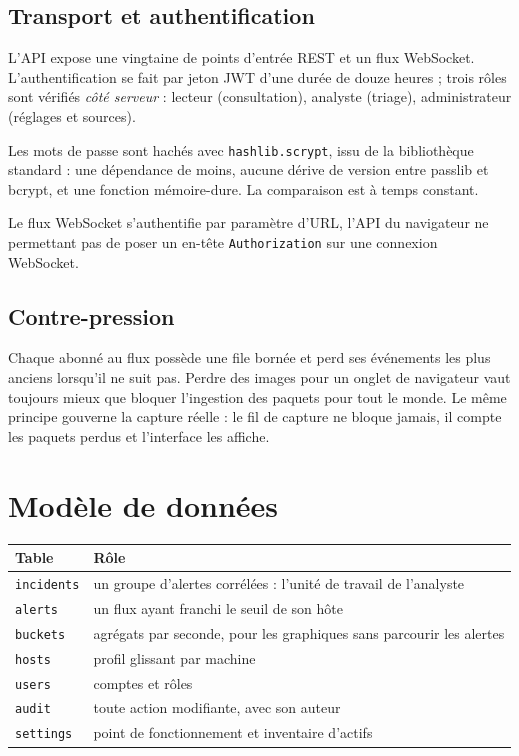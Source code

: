 \documentclass[11pt,a4paper]{article}
\begin{document}
\subsection{Transport et authentification}

L'API expose une vingtaine de points d'entrée REST et un flux WebSocket. L'authentification se fait
par jeton JWT d'une durée de douze heures ; trois rôles sont vérifiés \emph{côté serveur} :
lecteur (consultation), analyste (triage), administrateur (réglages et sources).

Les mots de passe sont hachés avec \texttt{hashlib.scrypt}, issu de la bibliothèque standard : une
dépendance de moins, aucune dérive de version entre passlib et bcrypt, et une fonction
mémoire-dure. La comparaison est à temps constant.

Le flux WebSocket s'authentifie par paramètre d'URL, l'API du navigateur ne permettant pas de poser
un en-tête \texttt{Authorization} sur une connexion WebSocket.

\subsection{Contre-pression}

Chaque abonné au flux possède une file bornée et perd ses événements les plus anciens lorsqu'il ne
suit pas. Perdre des images pour un onglet de navigateur vaut toujours mieux que bloquer l'ingestion
des paquets pour tout le monde. Le même principe gouverne la capture réelle : le fil de capture ne
bloque jamais, il compte les paquets perdus et l'interface les affiche.

\section{Modèle de données}

\begin{table}[h]\centering\small
\begin{tabularx}{\linewidth}{@{}l X@{}}
\toprule
\textbf{Table} & \textbf{Rôle} \\
\midrule
\texttt{incidents} & un groupe d'alertes corrélées : l'unité de travail de l'analyste \\
\texttt{alerts} & un flux ayant franchi le seuil de son hôte \\
\texttt{buckets} & agrégats par seconde, pour les graphiques sans parcourir les alertes \\
\texttt{hosts} & profil glissant par machine \\
\texttt{users} & comptes et rôles \\
\texttt{audit} & toute action modifiante, avec son auteur \\
\texttt{settings} & point de fonctionnement et inventaire d'actifs \\
\bottomrule
\end{tabularx}
\end{table}
\end{document}
